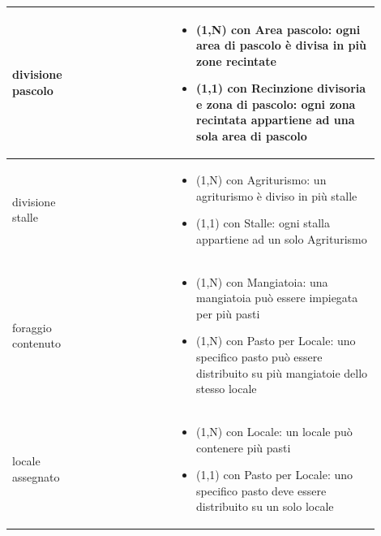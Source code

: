 \documentclass[12pt,a4paper]{article}
\begin{document}
\begin{center}
\begin{longtable}{|p{0.16\linewidth}|p{0.24\linewidth}|p{0.50\linewidth}|}
\hline
divisione pascolo 				& \begin{flushleft}\vspace{-15pt}  \end{flushleft}
					& \begin{itemize}
						\setlength{\itemindent}{-1em}
						\vspace{-25pt}
						\setlength\itemsep{-0.25em}
						\item (1,N) con Area pascolo: ogni area di pascolo è divisa in più zone recintate
						\item (1,1) con Recinzione divisoria e zona di pascolo: ogni zona recintata appartiene ad una sola area di pascolo
					\end{itemize}\\ 

\hline
divisione stalle 				& \begin{flushleft}\vspace{-15pt}  \end{flushleft}
					& \begin{itemize}
						\setlength{\itemindent}{-1em}
						\vspace{-25pt}
						\setlength\itemsep{-0.25em}
						\item (1,N) con Agriturismo: un agriturismo è diviso in più stalle
						\item (1,1) con Stalle: ogni stalla appartiene ad un solo Agriturismo
					\end{itemize}\\ 

\hline
foraggio contenuto 				& \begin{flushleft}\vspace{-15pt}  \end{flushleft}
					& \begin{itemize}
						\setlength{\itemindent}{-1em}
						\vspace{-25pt}
						\setlength\itemsep{-0.25em}
						\item (1,N) con Mangiatoia: una mangiatoia può essere impiegata per più pasti
						\item (1,N) con Pasto per Locale: uno specifico pasto può essere distribuito su più mangiatoie dello stesso locale
					\end{itemize}\\ 

\hline
locale assegnato 				& \begin{flushleft}\vspace{-25pt} \end{flushleft}
					& \begin{itemize}
						\setlength{\itemindent}{-1em}
						\vspace{-25pt}
						\setlength\itemsep{-0.25em}
						\item (1,N) con Locale: un locale può contenere più pasti
						\item (1,1) con Pasto per Locale: uno specifico pasto deve essere distribuito su un solo locale
					\end{itemize}\\ 


\end{longtable}
\end{center}
\end{document}
